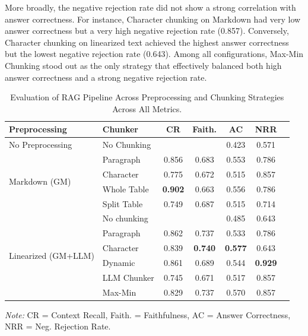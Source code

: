 \documentclass[12pt]{article} %
\begin{document}
More broadly, the negative rejection rate did not show a strong correlation with answer correctness. For instance, Character chunking on Markdown had very low answer correctness but a very high negative rejection rate (0.857). Conversely, Character chunking on linearized text achieved the highest answer correctness but the lowest negative rejection rate (0.643). Among all configurations, Max-Min Chunking stood out as the only strategy that effectively balanced both high answer correctness and a strong negative rejection rate.

\begin{table}[htbp]
    \centering
    \footnotesize
    \setlength{\tabcolsep}{3.5pt}
    \renewcommand{\arraystretch}{1.1}
    \caption{Evaluation of RAG Pipeline Across Preprocessing and Chunking Strategies Across All Metrics.}
    \label{tab:rag_all_metrics_eval}
    \begin{tabular}{llccccc}
        \toprule
        \textbf{Preprocessing} & \textbf{Chunker} & \textbf{CR}    & \textbf{Faith.} & \textbf{AC}    & \textbf{NRR}   \\
        \midrule
        No Preprocessing       & No Chunking      &                &                 & 0.423          & 0.571          \\
        \midrule
        \multirow{4}{*}{Markdown (GM)}
                               & Paragraph        & 0.856          & 0.683           & 0.553          & 0.786          \\
                               & Character        & 0.775          & 0.672           & 0.515          & 0.857          \\
                               & Whole Table      & \textbf{0.902} & 0.663           & 0.556          & 0.786          \\
                               & Split Table      & 0.749          & 0.687           & 0.515          & 0.714          \\
        \midrule
        \multirow{6}{*}{Linearized (GM+LLM)}
                               & No chunking      &                &                 & 0.485          & 0.643          \\
                               & Paragraph        & 0.862          & 0.737           & 0.533          & 0.786          \\
                               & Character        & 0.839          & \textbf{0.740}  & \textbf{0.577} & 0.643          \\
                               & Dynamic          & 0.861          & 0.689           & 0.544          & \textbf{0.929} \\
                               & LLM Chunker      & 0.745          & 0.671           & 0.517          & 0.857          \\
                               & Max-Min          & 0.829          & 0.737           & 0.570          & 0.857          \\
        \bottomrule
    \end{tabular}
    \vskip 3pt
        {\scriptsize \textit{Note:} CR = Context Recall, Faith. = Faithfulness, AC = Answer Correctness, NRR = Neg. Rejection Rate.}
\end{table}
\end{document}
